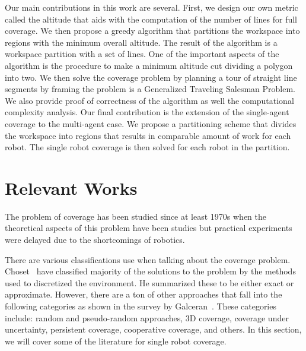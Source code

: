 \documentclass[../main.tex]{subfiles}
\begin{document}
Our main contributions in this work are several. First, we design our own metric called the altitude that aids with the computation of the number of lines for full coverage. We then propose a greedy algorithm that partitions the workspace into regions with the minimum overall altitude. The result of the algorithm is a workspace partition with a set of lines. One of the important aspects of the algorithm is the procedure to make a minimum altitude cut dividing a polygon into two. We then solve the coverage problem by planning a tour of straight line segments by framing the problem is a Generalized Traveling Salesman Problem. We also provide proof of correctness of the algorithm as well the computational complexity analysis. Our final contribution is the extension of the single-agent coverage to the multi-agent case. We propose a partitioning scheme that divides the workspace into regions that results in comparable amount of work for each robot. The single robot coverage is then solved for each robot in the partition. 

\section{Relevant Works}
\label{sec:relevant_works}

The problem of coverage has been studied since at least 1970s when the theoretical aspects of this problem have been studies but practical experiments were delayed due to the shortcomings of robotics.

There are various classifications use when talking about the coverage problem. Choset~\cite{choset2000coverage} have classified majority of the solutions to the problem by the methods used to discretized the environment. He summarized these to be either exact or approximate. However, there are a ton of other approaches that fall into the following categories as shown in the survey by Galceran~\cite{galceran2013survey}. These categories include: random and pseudo-random approaches, 3D coverage, coverage under uncertainty, persistent coverage, cooperative coverage, and others. In this section, we will cover some of the literature for single robot coverage.
\end{document}
